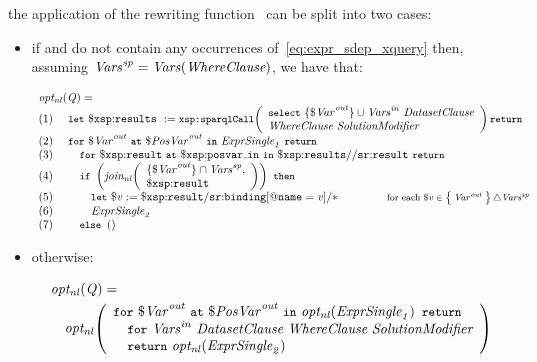 \noindent
the application of the rewriting function~ can be split into two cases:
%
\begin{itemize}
\item if  and  do not contain any occurrences
  of~\eqref{eq:expr_sdep_xquery} then, assuming ${\mathit{\mathit{Vars}}}_{\mathit{}}^{\mathit{sp}} = \mathit{\mathit{Vars}}\!\left({\textit{Whe\-re\-Clause}}\right)$, we have that:
%
\begin{small}
\begin{equation*}
\begin{array}{l}
  \onl{\envElem{Q}{}} =\\
  \mathrm{(1)~~~~} \LET~\varR{results}~:= \funcCallR{sparqlCall}{\begin{array}{l}
      \SELECT~\{ \gsup{\var{Var}}{out} \}  \cup \gsup{\Vars}{in}~\DatasetClause \\
      \SparqlWhereClause~\SolutionModifier
    \end{array}} \RETURN\\
  \mathrm{(2)~~~~} \FOR~\gsup{\var{Var}}{out}~\AT~\gsup{\var{PosVar}}{out}~\IN~\envElem{\ExprSingle}{1}~\RETURN\\
  \mathrm{(3)~~~~} \quad \FOR~\varR{result}~\AT~\varR{posvar\mathunderscore{}in}~\IN~\varR{results//sr{:}result}~\RETURN \\
  \mathrm{(4)~~~~} \quad \IF~\left(\funcCall{join_{nl}}{\begin{array}{l}
        \{ \gsup{\var{Var}}{out} \} \cap \gsup{\Vars}{sp},\\
        \varR{result}
      \end{array}
    }\right)~\THEN\\
  \mathrm{(5)~~~~} \qquad \LET~\var{v} := \varR{result/sr{:}binding[@name = \varName{v}]/*}~\qquad\qquad \hfill {\textrm{\smaller for each~$\var{v} \in \set{ \gsup{Var}{out} } \triangle \gsup{\Vars}{sp}$}}\\
  \mathrm{(6)~~~~} \qquad \envElem{\ExprSingle}{2}\\
  \mathrm{(7)~~~~} \quad \ELSE~\left(\right)
\end{array}
\end{equation*}
\end{small}%
%
\item otherwise:
%
\begin{small}
\begin{equation*}
\begin{array}{r@{~~~}l}
  \multicolumn{2}{l}{\onl{\envElem{Q}{}} =}\\[.3em]
   & \onl{\begin{array}{l}
       \FOR~\gsup{\var{Var}}{out}~\AT~\gsup{\var{PosVar}}{out}~\IN~\onl{\envElem{\ExprSingle}{1}}~\RETURN\\
       \quad \FOR~\gsup{\Vars}{in}~\DatasetClause~\SparqlWhereClause~\SolutionModifier\\
       \quad \RETURN~\onl{\envElem{\ExprSingle}{2}}
\end{array}
}
\end{array}
\end{equation*}
\end{small}%

\end{itemize}
